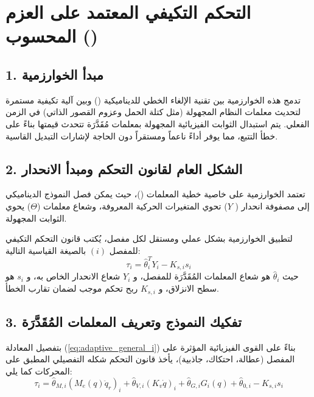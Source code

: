 \section{التحكم التكيفي المعتمد على العزم المحسوب ()}
\label{sec:actc_control}

\subsection*{1. مبدأ الخوارزمية}
تدمج هذه الخوارزمية بين تقنية الإلغاء الخطي للديناميكية () وبين آلية تكيفية مستمرة لتحديث معلمات النظام المجهولة (مثل كتلة الحمل وعزوم القصور الذاتي) في الزمن الفعلي. يتم استبدال الثوابت الفيزيائية المجهولة بمعلمات مُقَدَّرَة تتحدث قيمتها بناءً على خطأ التتبع، مما يوفر أداءً ناعماً ومستقراً دون الحاجة لإشارات التبديل القاسية.

\subsection*{2. الشكل العام لقانون التحكم ومبدأ الانحدار}
تعتمد الخوارزمية على خاصية خطية المعلمات ()، حيث يمكن فصل النموذج الديناميكي إلى مصفوفة انحدار ( $Y$) تحوي المتغيرات الحركية المعروفة، وشعاع معلمات ($\Theta$) يحوي الثوابت المجهولة. 

لتطبيق الخوارزمية بشكل عملي ومستقل لكل مفصل، يُكتب قانون التحكم التكيفي للمفصل $(i)$ بالصيغة القياسية التالية:
\begin{equation}
\tau_i = \hat{\theta}_i^T Y_i - K_{s,i} s_i
\label{eq:adaptive_general_i}
\end{equation}
حيث $\hat{\theta}_i$ هو شعاع المعلمات المُقَدَّرَة للمفصل، و $Y_i$ شعاع الانحدار الخاص به، و $s_i$ هو سطح الانزلاق، و $K_{s,i}$ ربح تحكم موجب لضمان تقارب الخطأ.

\subsection*{3. تفكيك النموذج وتعريف المعلمات المُقَدَّرَة}
بتفصيل المعادلة (\ref{eq:adaptive_general_i}) بناءً على القوى الفيزيائية المؤثرة على المفصل (عطالة، احتكاك، جاذبية)، يأخذ قانون التحكم شكله التفصيلي المطبق على المحركات كما يلي:
\begin{equation}
\tau_i = \hat{\theta}_{M,i} (M_e(q)\ddot{q}_r)_i + \hat{\theta}_{V,i} (K_v \dot{q})_i + \hat{\theta}_{G,i} G_i(q) + \hat{\theta}_{0,i} - K_{s,i} s_i
\label{eq:adaptive_detailed_i}
\end{equation}

